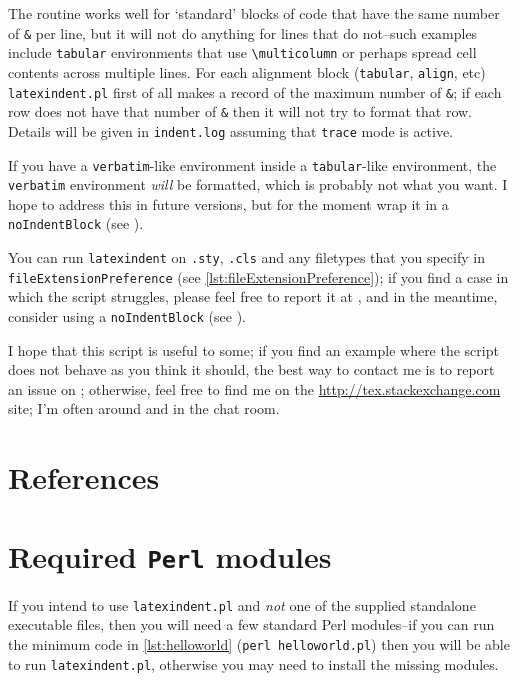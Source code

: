 \documentclass[11pt]{article}
\begin{document}
The routine works well for `standard' blocks of code that have the same number of \lstinline!&!
per line, but it will not do anything for lines that do not--such examples
include \lstinline!tabular! environments that use \lstinline!\multicolumn! or
perhaps spread cell contents across multiple lines.  For each alignment block (\lstinline!tabular!,
\lstinline!align!, etc) \lstinline!latexindent.pl! first of all makes a record
of the maximum number of \lstinline!&!; if each row does not have that
number of \lstinline!&! then it will not try to format that row. Details
will be given in \lstinline!indent.log! assuming that \lstinline!trace! mode
is active.

If you have a \lstinline!verbatim!-like environment inside a \lstinline!tabular!-like
environment, the \lstinline!verbatim! environment \emph{will} be formatted, which
is probably not what you want. I hope to address this in future versions, but for the
moment wrap it in a \lstinline!noIndentBlock! (see ).

You can run \lstinline!latexindent! on \lstinline!.sty!, \lstinline!.cls! and any filetypes
that you specify in \lstinline[breaklines=true]!fileExtensionPreference! (see \vref{lst:fileExtensionPreference}); 
if you find a case in which the script struggles, please feel free
to report it at \cite{latexindent-home}, and
in the meantime, consider using a \lstinline!noIndentBlock! (see ).

I hope that this script is useful to some; if you find an example where the
script does not behave as you think it should, the best way to contact me is to
report an issue on \cite{latexindent-home}; otherwise, feel free to find me on 
the \url{http://tex.stackexchange.com} site; I'm often around
and in the chat room.

\nocite{*}
\section{References}
\printbibliography[heading=subbibnumbered,title={External links},notkeyword=contributor]
\printbibliography[env=specialbib,heading=subbibnumbered,title={Contributors\label{sec:contributors}},keyword=contributor]

\appendix
\section{Required \lstinline!Perl! modules}\label{sec:requiredmodules}
If you intend to use \lstinline!latexindent.pl! and \emph{not} one of the supplied standalone executable files, then you will need a few standard Perl modules--if you can run the
minimum code in \cref{lst:helloworld} (\lstinline!perl helloworld.pl!) then you will be able to run \lstinline!latexindent.pl!, otherwise you may
need to install the missing modules.
\end{document}

